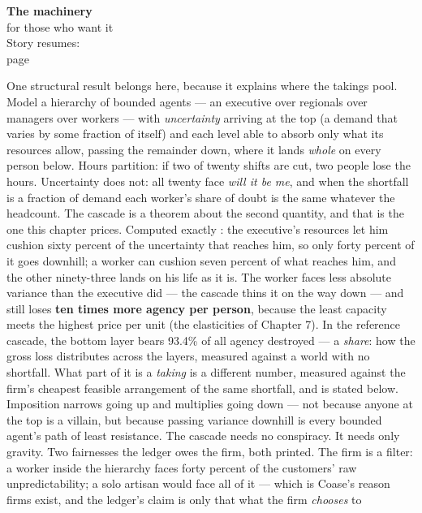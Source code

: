\begin{machinery}{\textbf{The machinery}\\for those who want it\\[3pt]{\color{muted}Story resumes:\\page~\pageref{ch14}}}


One structural result belongs here, because it explains where the
takings pool. Model a hierarchy of bounded agents --- an executive over
regionals over managers over workers --- with \emph{uncertainty} arriving at
the top (a demand that varies by some fraction of itself) and each
level able to absorb only what its resources allow, passing the
remainder down, where it lands \emph{whole} on every person below. Hours
partition: if two of twenty shifts are cut, two people lose the hours.
Uncertainty does not: all twenty face \emph{will it be me}, and when the
shortfall is a fraction of demand each worker's share of doubt is the
same whatever the headcount. The cascade is a theorem about the second
quantity, and that is the one this chapter prices.
Computed exactly : the executive's resources let
him cushion sixty percent of the uncertainty that reaches him, so only
forty percent of it goes downhill; a worker can cushion seven percent
of what reaches him, and the other ninety-three lands on his life as
it is. The worker faces less absolute variance than the executive did
--- the cascade thins it on the way down --- and still loses \textbf{ten times
more agency per person}, because the least capacity meets the
highest price per unit (the elasticities of Chapter 7). In the reference
cascade, the bottom layer bears 93.4\% of all agency destroyed --- a
\emph{share}: how the gross loss distributes across the layers, measured
against a world with no shortfall. What part of it is a \emph{taking} is a
different number, measured against the firm's cheapest feasible
arrangement of the same shortfall, and is stated below.
Imposition narrows going up and multiplies going down --- not because
anyone at the top is a villain, but because passing variance downhill
is every bounded agent's path of least resistance. The cascade needs
no conspiracy. It needs only gravity. Two fairnesses the ledger owes
the firm, both printed. The firm is a filter: a worker inside the
hierarchy faces forty percent of the customers' raw unpredictability;
a solo artisan would face all of it --- which is Coase's reason firms
exist, and the ledger's claim is only that what the firm \emph{chooses} to

\end{machinery}
